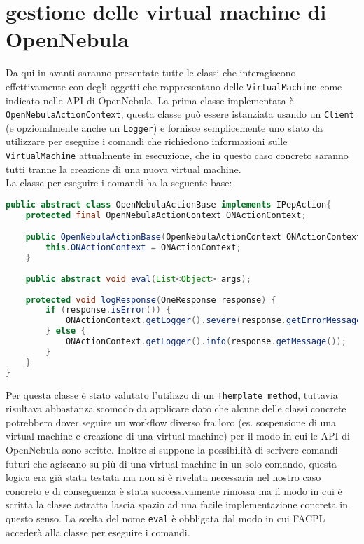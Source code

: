\section{gestione delle virtual machine di OpenNebula}
Da qui in avanti saranno presentate tutte le classi che interagiscono effettivamente con degli oggetti che rappresentano delle \texttt{VirtualMachine} come indicato nelle API di OpenNebula.
La prima classe implementata è \texttt{OpenNebulaActionContext}, questa classe può essere istanziata usando un \texttt{Client} (e opzionalmente anche un \texttt{Logger}) e fornisce semplicemente uno stato da utilizzare per eseguire i comandi che richiedono informazioni sulle \texttt{VirtualMachine} attualmente in esecuzione, che in questo caso concreto saranno tutti tranne la creazione di una nuova virtual machine.\\
La classe per eseguire i comandi ha la seguente base:
\begin{lstlisting}[language=Java, caption=Classe astratta per i comandi, label=code:OpenNebulaActionBase]
public abstract class OpenNebulaActionBase implements IPepAction{
    protected final OpenNebulaActionContext ONActionContext;

    public OpenNebulaActionBase(OpenNebulaActionContext ONActionContext) {
        this.ONActionContext = ONActionContext;
    }
    
    public abstract void eval(List<Object> args);
    
    protected void logResponse(OneResponse response) {
        if (response.isError()) {
            ONActionContext.getLogger().severe(response.getErrorMessage());
        } else {
            ONActionContext.getLogger().info(response.getMessage());
        }
    }
}
\end{lstlisting}
Per questa classe è stato valutato l'utilizzo di un \texttt{Themplate method}, tuttavia risultava abbastanza scomodo da applicare dato che alcune delle classi concrete potrebbero dover seguire un workflow diverso fra loro (es. sospensione di una virtual machine e creazione di una virtual machine) per il modo in cui le API di OpenNebula sono scritte. Inoltre si suppone la possibilità di scrivere comandi futuri che agiscano su più di una virtual machine in un solo comando, questa logica era già stata testata ma non si è rivelata necessaria nel nostro caso concreto e di conseguenza è stata successivamente rimossa ma il modo in cui è scritta la classe astratta lascia spazio ad una facile implementazione concreta in questo senso.\medbreak
La scelta del nome \texttt{eval} è obbligata dal modo in cui FACPL accederà alla classe per eseguire i comandi.
